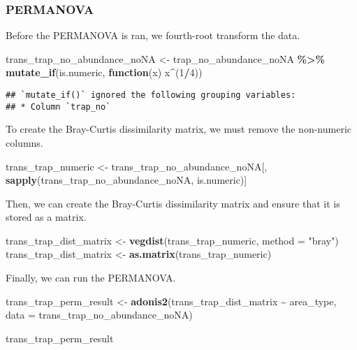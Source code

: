 \documentclass[
]{article}
\newenvironment{Shaded}{\begin{snugshade}}{\end{snugshade}}
\newcommand{\AttributeTok}[1]{\textcolor[rgb]{0.13,0.29,0.53}{#1}}
\newcommand{\ControlFlowTok}[1]{\textcolor[rgb]{0.13,0.29,0.53}{\textbf{#1}}}
\newcommand{\DecValTok}[1]{\textcolor[rgb]{0.00,0.00,0.81}{#1}}
\newcommand{\FunctionTok}[1]{\textcolor[rgb]{0.13,0.29,0.53}{\textbf{#1}}}
\newcommand{\NormalTok}[1]{#1}
\newcommand{\OtherTok}[1]{\textcolor[rgb]{0.56,0.35,0.01}{#1}}
\newcommand{\SpecialCharTok}[1]{\textcolor[rgb]{0.81,0.36,0.00}{\textbf{#1}}}
\newcommand{\StringTok}[1]{\textcolor[rgb]{0.31,0.60,0.02}{#1}}
\begin{document}
\hypertarget{permanova}{%
\subsubsection{PERMANOVA}\label{permanova}}

Before the PERMANOVA is ran, we fourth-root transform the data.

\begin{Shaded}
\begin{Highlighting}[]
\NormalTok{trans\_trap\_no\_abundance\_noNA }\OtherTok{\textless{}{-}}\NormalTok{ trap\_no\_abundance\_noNA }\SpecialCharTok{\%\textgreater{}\%}
  \FunctionTok{mutate\_if}\NormalTok{(is.numeric, }\ControlFlowTok{function}\NormalTok{(x) x}\SpecialCharTok{\^{}}\NormalTok{(}\DecValTok{1}\SpecialCharTok{/}\DecValTok{4}\NormalTok{))}
\end{Highlighting}
\end{Shaded}

\begin{verbatim}
## `mutate_if()` ignored the following grouping variables:
## * Column `trap_no`
\end{verbatim}

To create the Bray-Curtis dissimilarity matrix, we must remove the
non-numeric columns.

\begin{Shaded}
\begin{Highlighting}[]
\NormalTok{trans\_trap\_numeric }\OtherTok{\textless{}{-}}\NormalTok{ trans\_trap\_no\_abundance\_noNA[, }\FunctionTok{sapply}\NormalTok{(trans\_trap\_no\_abundance\_noNA, is.numeric)]}
\end{Highlighting}
\end{Shaded}

Then, we can create the Bray-Curtis dissimilarity matrix and ensure that
it is stored as a matrix.

\begin{Shaded}
\begin{Highlighting}[]
\NormalTok{trans\_trap\_dist\_matrix }\OtherTok{\textless{}{-}} \FunctionTok{vegdist}\NormalTok{(trans\_trap\_numeric, }\AttributeTok{method =} \StringTok{"bray"}\NormalTok{)}
\NormalTok{trans\_trap\_dist\_matrix }\OtherTok{\textless{}{-}} \FunctionTok{as.matrix}\NormalTok{(trans\_trap\_numeric)}
\end{Highlighting}
\end{Shaded}

Finally, we can run the PERMANOVA.

\begin{Shaded}
\begin{Highlighting}[]
\NormalTok{trans\_trap\_perm\_result }\OtherTok{\textless{}{-}} \FunctionTok{adonis2}\NormalTok{(trans\_trap\_dist\_matrix }\SpecialCharTok{\textasciitilde{}}\NormalTok{ area\_type, }\AttributeTok{data =}\NormalTok{ trans\_trap\_no\_abundance\_noNA)}

\NormalTok{trans\_trap\_perm\_result}
\end{Highlighting}
\end{Shaded}
\end{document}
